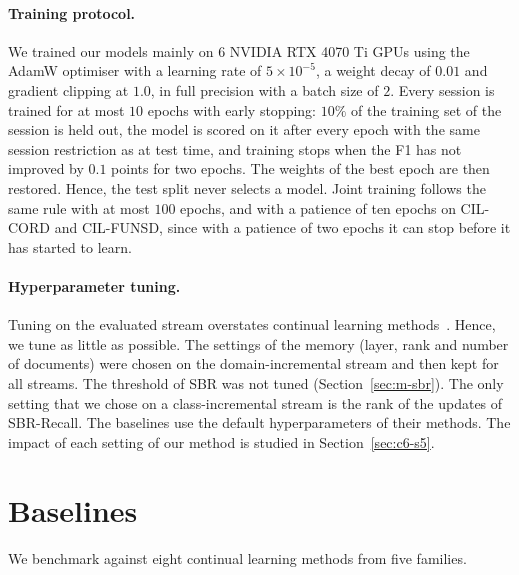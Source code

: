 \paragraph{Training protocol.} We trained our models mainly on 6 NVIDIA RTX 4070 Ti GPUs
using the AdamW optimiser with a learning rate of $5\times10^{-5}$, a weight decay of
$0.01$ and gradient clipping at $1.0$, in full precision with a batch size of $2$. Every
session is trained for at most $10$ epochs with early stopping: $10\%$ of the training set
of the session is held out, the model is scored on it after every epoch with the same
session restriction as at test time, and training stops when the F1 has not improved by
$0.1$ points for two epochs. The weights of the best epoch are then restored. Hence, the
test split never selects a model. Joint training follows the same rule with at most $100$
epochs, and with a patience of ten epochs on CIL-CORD and CIL-FUNSD, since with a patience
of two epochs it can stop before it has started to learn.

\paragraph{Hyperparameter tuning.} Tuning on the evaluated stream overstates continual
learning methods~\citep{cha2025hyperparameters}. Hence, we tune as little as possible. The
settings of the memory (layer, rank and number of documents) were chosen on the
domain-incremental stream and then kept for all streams. The threshold of SBR was not
tuned (Section~\ref{sec:m-sbr}). The only setting that we chose on a class-incremental
stream is the rank of the updates of SBR-Recall. The baselines use the default
hyperparameters of their methods. The impact of each setting of our method is studied in
Section~\ref{sec:c6-s5}.

\section{Baselines}
\label{sec:e-baselines}

We benchmark against eight continual learning methods from five families.

